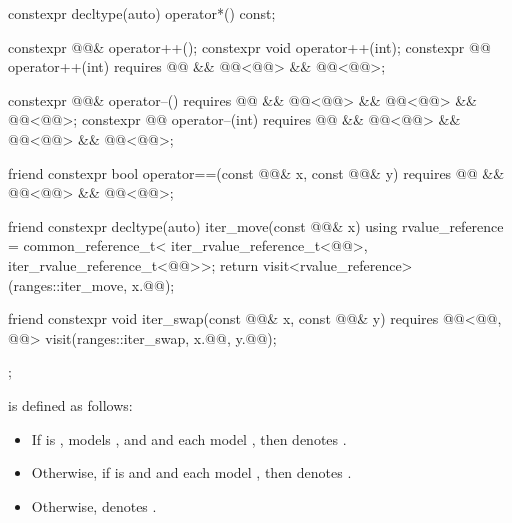 \begin{codeblock}
{{    constexpr decltype(auto) operator*() const;

    constexpr @@& operator++();
    constexpr void operator++(int);
    constexpr @@ operator++(int)
        requires @@ && @@<@@> &&
                 @@<@@>;

    constexpr @@& operator--()
        requires @@ && @@<@@> &&
                 @@<@@> && @@<@@>;
    constexpr @@ operator--(int)
        requires @@ && @@<@@> &&
                 @@<@@> && @@<@@>;

    friend constexpr bool operator==(const @@& x, const @@& y)
        requires @@ && @@<@@> &&
                 @@<@@>;

    friend constexpr decltype(auto) iter_move(const @@& x) {
      using rvalue_reference = common_reference_t<
        iter_rvalue_reference_t<@@>,
        iter_rvalue_reference_t<@@>>;
      return visit<rvalue_reference>(ranges::iter_move, x.@@);
    }

    friend constexpr void iter_swap(const @@& x, const @@& y)
        requires @@<@@, @@> {
      visit(ranges::iter_swap, x.@@, y.@@);
    }
  };
}
\end{codeblock}

\pnum
{} is defined as follows:
\begin{itemize}
\item
If  is ,
 models , and
 and 
each model ,
then  denotes .
\item
Otherwise, if  is  and
 and  each model ,
then  denotes .
\item
Otherwise,  denotes .
\end{itemize}

